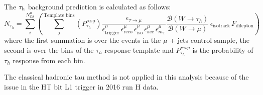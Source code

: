 The $\tau_\mathrm{h}$ background prediction is calculated as follows:
\begin{equation}
N_{\tau_{h}} = \sum\limits_i^{N_\mathrm{CS}^\mu}\left(\sum\limits_j^\text{Template bins}(P_{\tau_h}^\text{resp})
\frac{\epsilon_{\tau \rightarrow \mu}}{\epsilon^{\mu}_\text{trigger}\,\epsilon^{\mu}_\text{reco}\,\epsilon^{\mu}_\text{iso}\,\epsilon^{\mu}_\text{acc}\,\epsilon^{\mu}_{m_\text{T}}} \dfrac{ \mathcal{B}(W \rightarrow \tau_h)}{\mathcal{B}(W \rightarrow \mu)}\,\epsilon_\text{isotrack}\,F_\text{dilepton}\right)
\label{eq:tauh}
\end{equation}
where the first summation is over the events in the $\mu$ + jets control sample, the second is over the bins of the $\tau_h$ response template and $P_{\tau_h}^{resp}$ is the probability of $\tau_h$ response from each bin.

The classical hadronic tau method is not applied in this analysis because of the issue in the HT bit L1 trigger in 2016 run H data.
